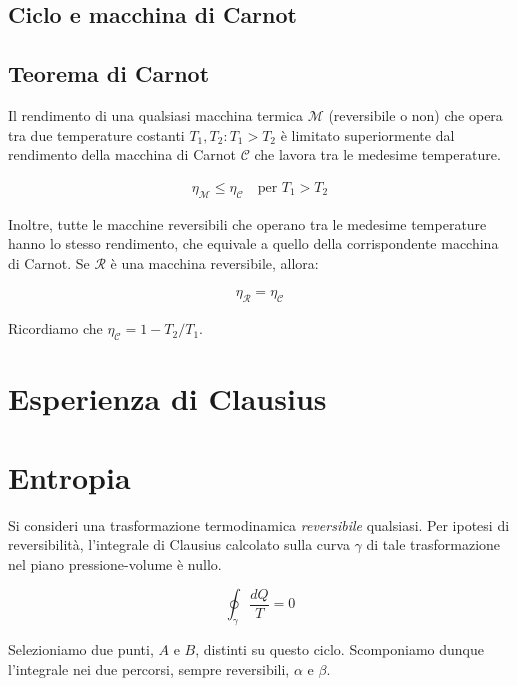 \subsection{Ciclo e macchina di Carnot}

\subsection{Teorema di Carnot}

\begin{tcolorbox}[colback = red!30, colframe = red!30!black, title = {Teorema di Carnot}]
Il rendimento di una qualsiasi macchina termica $\mathcal{M}$ (reversibile o non)
che opera tra due
temperature costanti $T_1,T_2: T_1 > T_2$ è limitato superiormente dal rendimento della
macchina di Carnot $\mathcal{C}$ che lavora tra le medesime temperature.

\begin{align}
    \eta_\mathcal{M} \leq \eta_\mathcal{C} \quad \text{per } T_1 > T_2\label{carnot1}
\end{align}

Inoltre, tutte le macchine reversibili che operano tra le medesime temperature
hanno lo stesso rendimento, che equivale a quello della corrispondente macchina di
Carnot. Se $\mathcal{R}$ è una macchina reversibile, allora:

\begin{align}
    \eta_\mathcal{R} = \eta_\mathcal{C}\label{carnot2}
\end{align}

\end{tcolorbox}

\noindent Ricordiamo che $\eta_\mathcal{C} = 1 - T_2 / T_1$.



\section{Esperienza di Clausius}

\section{Entropia}
Si consideri una trasformazione termodinamica \textit{reversibile} qualsiasi.
Per ipotesi di reversibilità, l'integrale di Clausius calcolato sulla curva $\gamma$
di tale trasformazione nel piano pressione-volume è nullo.

\[ \oint_\gamma \frac{dQ}{T} = 0 \]

\noindent Selezioniamo due punti, $A$ e $B$, distinti su questo ciclo. Scomponiamo
dunque l'integrale nei due percorsi, sempre reversibili, $\alpha$ e $\beta$.

